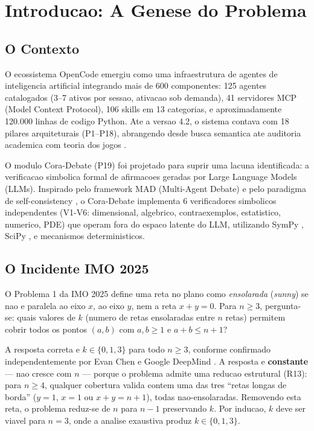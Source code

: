 \documentclass[5p]{elsarticle}
\begin{document}
\newpage
\tableofcontents
\newpage

\section{Introducao: A Genese do Problema}

\subsection{O Contexto}

O ecossistema OpenCode \cite{opencode2026} emergiu como uma infraestrutura de
agentes de inteligencia artificial integrando mais de 600 componentes: 125
agentes catalogados (3--7 ativos por sessao, ativacao sob demanda), 41
servidores MCP (Model Context Protocol), 106 skills em 13 categorias, e
aproximadamente 120.000 linhas de codigo Python. Ate a versao 4.2, o sistema
contava com 18 pilares arquiteturais (P1--P18), abrangendo desde busca semantica
ate auditoria academica com teoria dos jogos \cite{nash1950}.

O modulo Cora-Debate (P19) \cite{cora2026} foi projetado para suprir uma lacuna
identificada: a verificacao simbolica formal de afirmacoes geradas por Large
Language Models (LLMs). Inspirado pelo framework MAD (Multi-Agent Debate)
\cite{liang2023} e pelo paradigma de self-consistency \cite{wang2023}, o
Cora-Debate implementa 6 verificadores simbolicos independentes (V1-V6: dimensional,
algebrico, contraexemplos, estatistico, numerico, PDE) que operam fora do espaco
latente do LLM, utilizando SymPy \cite{meurer2017}, SciPy \cite{virtanen2020},
e mecanismos deterministicos.

\subsection{O Incidente IMO 2025}

O Problema 1 da IMO 2025 \cite{imo2025} define uma reta no plano como
\textit{ensolarada} (\textit{sunny}) se nao e paralela ao eixo $x$, ao eixo
$y$, nem a reta $x+y=0$. Para $n\geq 3$, pergunta-se: quais valores de $k$
(numero de retas ensolaradas entre $n$ retas) permitem cobrir todos os pontos
$(a,b)$ com $a,b\geq 1$ e $a+b\leq n+1$?

A resposta correta e $k\in\{0,1,3\}$ para todo $n\geq 3$, conforme confirmado
independentemente por Evan Chen \cite{chen2025} e Google DeepMind \cite{deepmind2025}.
A resposta e \textbf{constante} --- nao cresce com $n$ --- porque o problema
admite uma reducao estrutural (R13): para $n\geq 4$, qualquer cobertura valida
contem uma das tres ``retas longas de borda'' ($y=1$, $x=1$ ou $x+y=n+1$),
todas nao-ensolaradas. Removendo esta reta, o problema reduz-se de $n$ para
$n-1$ preservando $k$. Por inducao, $k$ deve ser viavel para $n=3$, onde a
analise exaustiva produz $k\in\{0,1,3\}$.
\end{document}
